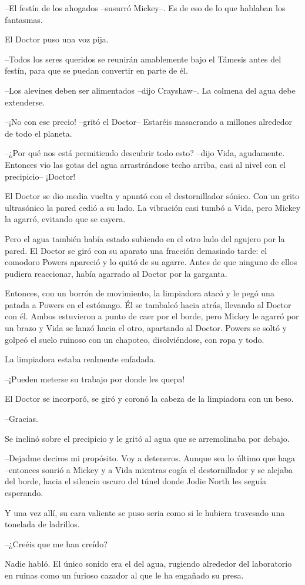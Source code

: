 {--El festín de los ahogados --susurró Mickey--. Es de eso de lo que
hablaban los fantasmas.}

{El Doctor puso una voz pija.}

{--Todos los seres queridos se reunirán amablemente bajo el Támesis
antes del festín, para que se puedan convertir en parte de él.}

{--Los alevines deben ser alimentados --dijo Crayshaw--. La colmena del
agua debe extenderse.}

{--¡No con ese precio! --gritó el Doctor-- Estaréis masacrando a
millones alrededor de todo el planeta.}

{--¿Por qué nos está permitiendo descubrir todo esto? --dijo Vida,
 agudamente. Entonces vio las gotas del agua arrastrándose techo arriba,
casi al nivel con el precipicio-- ¡Doctor!}

{El Doctor se dio media vuelta y apuntó con el destornillador sónico.
 Con un grito ultrasónico la pared cedió a su lado. La vibración casi
tumbó a Vida, pero Mickey la agarró, evitando que se cayera.}

{Pero el agua también había estado subiendo en el otro lado del agujero
 por la pared. El Doctor se giró con su aparato una fracción demasiado
 tarde: el comodoro Powers apareció y lo quitó de su agarre. Antes de que
 ninguno de ellos pudiera reaccionar, había agarrado al Doctor por la
garganta.}

{Entonces, con un borrón de movimiento, la limpiadora atacó y le pegó
 una patada a Powers en el estómago. Él se tambaleó hacia atrás, llevando
 al Doctor con él. Ambos estuvieron a punto de caer por el borde, pero
 Mickey le agarró por un brazo y Vida se lanzó hacia el otro, apartando
 al Doctor. Powers se soltó y golpeó el suelo ruinoso con un chapoteo,
disolviéndose, con ropa y todo.}

{La limpiadora estaba realmente enfadada.}

{--¡Pueden meterse su trabajo por donde les quepa!}

{El Doctor se incorporó, se giró y coronó la cabeza de la limpiadora con
un beso.}

{--Gracias.}

{Se inclinó sobre el precipicio y le gritó al agua que se arremolinaba
por debajo.}

{--Dejadme deciros mi propósito. Voy a deteneros. Aunque sea lo último
 que haga --entonces sonrió a Mickey y a Vida mientras cogía el
 destornillador y se alejaba del borde, hacia el silencio oscuro del
túnel donde Jodie North les seguía esperando.}

{Y una vez allí, su cara valiente se puso seria como si le hubiera
travesado una tonelada de ladrillos.}

{--¿Creéis que me han creído?}

{Nadie habló. El único sonido era el del agua, rugiendo alrededor del
 laboratorio en ruinas como un furioso cazador al que le ha engañado su
presa.}
